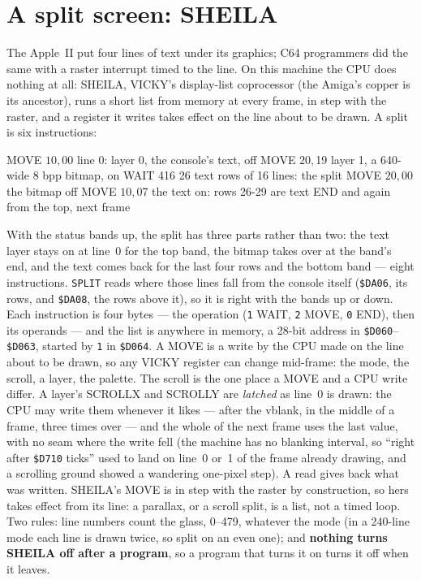 \section{A split screen: SHEILA}\label{sec:split}
The Apple~II put four lines of text under its graphics; C64 programmers
did the same with a raster interrupt timed to the line. On this machine
the CPU does nothing at all: SHEILA, VICKY's display-list coprocessor
(the Amiga's copper is its ancestor), runs a short list from memory at
every frame, in step with the raster, and a register it writes takes
effect on the line about to be drawn. A split is six instructions:

\begin{type}
MOVE $10,$00     line 0: layer 0, the console's text, off
MOVE $20,$19     layer 1, a 640-wide 8 bpp bitmap, on
WAIT 416         26 text rows of 16 lines: the split
MOVE $20,$00     the bitmap off
MOVE $10,$07     the text on: rows 26-29 are text
END              and again from the top, next frame
\end{type}

\noindent With the status bands up, the split has three parts rather
than two: the text layer stays on at line~0 for the top band, the
bitmap takes over at the band's end, and the text comes back for the
last four rows and the bottom band --- eight instructions. \verb|SPLIT|
reads where those lines fall from the console itself (\texttt{\$DA06},
its rows, and \texttt{\$DA08}, the rows above it), so it is right with
the bands up or down. Each instruction is four bytes --- the operation (\texttt{1}
WAIT, \texttt{2} MOVE, \texttt{0} END), then its operands --- and the
list is anywhere in memory, a 28-bit address in \texttt{\$D060}--\texttt{\$D063},
started by \texttt{1} in \texttt{\$D064}. A MOVE is a write by the
CPU made on the line about to be drawn, so any VICKY register can change
mid-frame: the mode, the scroll, a layer, the palette. The scroll is the
one place a MOVE and a CPU write differ. A layer's SCROLLX and SCROLLY
are \emph{latched} as line~0 is drawn: the CPU may write them whenever
it likes --- after the vblank, in the middle of a frame, three times
over --- and the whole of the next frame uses the last value, with no
seam where the write fell (the machine has no blanking interval, so
``right after \texttt{\$D710} ticks'' used to land on line~0 or~1 of the
frame already drawing, and a scrolling ground showed a wandering
one-pixel step). A read gives back what was written. SHEILA's MOVE is
in step with the raster by construction, so hers takes effect from its
line: a parallax, or a scroll split, is a list, not a timed loop. Two
rules: line numbers count the glass,
0--479, whatever the mode (in a 240-line mode each line is drawn twice,
so split on an even one); and \textbf{nothing turns SHEILA off after a
program}, so a program that turns it on turns it off when it leaves.

